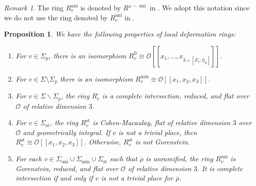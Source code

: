 \documentclass[a4paper, notitlepage, 10pt]{amsart}
\theoremstyle{plain} %
\newtheorem{proposition}[theorem]{Proposition}
\theoremstyle{definition} %
\theoremstyle{remark} %
\newtheorem{remark}[theorem]{Remark}
\numberwithin{equation}{section}
\newcommand{\uni}{\operatorname{uni}}
\newcommand{\st}{\operatorname{st}}
\begin{document}
\begin{remark}
    The ring $R^{\uni}_v$ is denoted by $R^{\varphi-\uni}$ in \cite{BKM2}. We adopt this notation since we do not use the ring denoted by $R^{\uni}_v$ in \cite{BKM2}. 
\end{remark}
\begin{proposition}\cite[Proposition 4.6]{BKM2}\label{propertiesoflocaldefrings}
    We have the following properties of local deformation rings:
    \begin{enumerate}
        \item For $v\in \Sigma_p$, there is an isomorphism $R_v^{\mathrm{fl}}\cong \mathcal{O}[[x_1,\dots,x_{3+[F_v:\mathbb{Q}_p]}]]$.
        \item For $v\in \Sigma\setminus \Sigma_p$ there is an isomorphism $R_v^{\min}\cong \mathcal{O}[[x_1,x_2,x_3]]$.
        \item For $v\in \Sigma\backslash \Sigma_p$, the ring $R_v^\square$ is a complete intersection, reduced, and flat over $\mathcal{O}$ of relative dimension $3$.
        \item For $v\in \Sigma_{\st}$, the ring $R_v^{\st}$ is Cohen-Macaulay, flat of relative dimension $3$ over $\mathcal{O}$ and geometrically integral. If $v$ is not a trivial place, then $R_v^{\st}\cong \mathcal{O}[[x_1,x_2,x_3]]$. Otherwise, $R_v^{\st}$ is not Gorenstein.
        \item For each $v\in \Sigma_{\uni}\cup \Sigma_{\min}\cup \Sigma_{\st}$ such that $\overline{\rho}$ is unramified, the ring $R_v^{\uni}$ is Gorenstein, reduced, and flat over $\mathcal{O}$ of relative dimension $3$. It is complete intersection if and only if $v$ is not a trivial place for $\overline{\rho}$.
    \end{enumerate}
\end{proposition}
\end{document}
